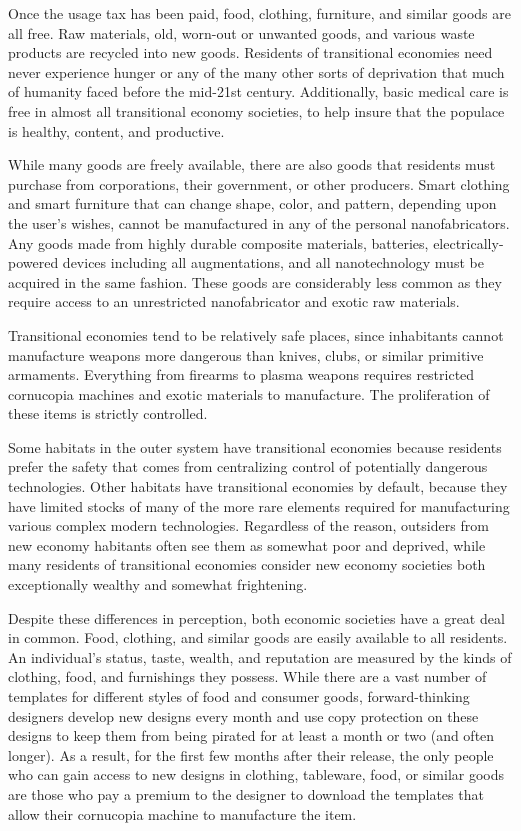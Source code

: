 Once the usage tax has been paid, food, clothing, furniture, and
similar goods are all free. Raw materials, old, worn-out or unwanted
goods, and various waste products are recycled into new
goods. Residents of transitional economies need never experience
hunger or any of the many other sorts of deprivation that much of
humanity faced before the mid-21st century. Additionally, basic
medical care is free in almost all transitional economy societies, to
help insure that the populace is healthy, content, and productive.

While many goods are freely available, there are also goods that
residents must purchase from corporations, their government, or other
producers. Smart clothing and smart furniture that can change shape,
color, and pattern, depending upon the user's wishes, cannot be
manufactured in any of the personal nanofabricators. Any goods made
from highly durable composite materials, batteries,
electrically-powered devices including all augmentations, and all
nanotechnology must be acquired in the same fashion. These goods are
considerably less common as they require access to an unrestricted
nanofabricator and exotic raw materials.

Transitional economies tend to be relatively safe places, since
inhabitants cannot manufacture weapons more dangerous than knives,
clubs, or similar primitive armaments. Everything from firearms to
plasma weapons requires restricted cornucopia machines and exotic
materials to manufacture. The proliferation of these items is strictly
controlled.

Some habitats in the outer system have transitional economies because
residents prefer the safety that comes from centralizing control of
potentially dangerous technologies. Other habitats have transitional
economies by default, because they have limited stocks of many of the
more rare elements required for manufacturing various complex modern
technologies. Regardless of the reason, outsiders from new economy
habitants often see them as somewhat poor and deprived, while many
residents of transitional economies consider new economy societies
both exceptionally wealthy and somewhat frightening.

Despite these differences in perception, both economic societies have
a great deal in common. Food, clothing, and similar goods are easily
available to all residents. An individual's status, taste, wealth, and
reputation are measured by the kinds of clothing, food, and
furnishings they possess. While there are a vast number of templates
for different styles of food and consumer goods, forward-thinking
designers develop new designs every month and use copy protection on
these designs to keep them from being pirated for at least a month or
two (and often longer).  As a result, for the first few months after
their release, the only people who can gain access to new designs in
clothing, tableware, food, or similar goods are those who pay a
premium to the designer to download the templates that allow their
cornucopia machine to manufacture the item.

